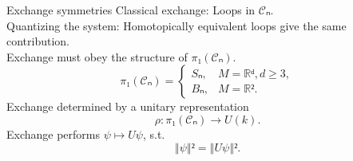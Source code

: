 \documentclass{beamer}
\begin{document}
\begin{frame}{Exchange symmetries}
  \vspace{0.5em}
  Classical exchange: Loops in $𝒞ₙ$. \\
  \pause
  Quantizing the system: Homotopically equivalent loops give the same contribution. \\
  \pause
  Exchange must obey the structure of $π₁(𝒞ₙ)$. \\
  \pause
  \begin{equation*}
    π₁(𝒞ₙ) =
    \begin{cases}
      Sₙ, & M = ℝᵈ, d ≥ 3, \\
      Bₙ, & M = ℝ².
    \end{cases}
  \end{equation*}
  \pause
  Exchange determined by a unitary representation
  \begin{equation*}
    ρ : π₁(𝒞ₙ) → U(k).
  \end{equation*}
  \pause
  Exchange performs $ψ ↦ Uψ$, s.t.
  \begin{equation*}
    ‖ψ‖² = ‖Uψ‖².
  \end{equation*}
\end{frame}
\end{document}
